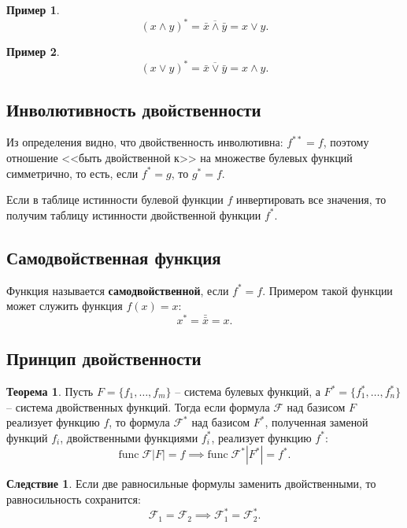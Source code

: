 \documentclass[a5paper, 11pt]{extarticle}
\theoremstyle{definition}
\newtheorem*{theorem*}{Теорема}
\newtheorem{example}{Пример}[subsection]
\theoremstyle{definition}
\theoremstyle{definition}
\newtheorem*{consequence*}{Следствие}
\numberwithin{figure}{section}
\numberwithin{table}{section}
\begin{document}
\begin{example}
    \[
        (x \land y)^* = \overline{\bar{x} \land \bar{y}} = x \lor y.
    \]
\end{example}

\begin{example}
    \[
        (x \lor y)^* = \overline{\bar{x} \lor \bar{y}} = x \land y.
    \]
\end{example}

\subsection{Инволютивность двойственности}

Из определения видно, что двойственность инволютивна: \(f^{**} = f\), поэтому отношение <<быть двойственной к>> на множестве булевых функций симметрично, то есть, если \(f^* = g\), то \(g^* = f\).

Если в таблице истинности булевой функции \(f\) инвертировать все значения, то получим таблицу истинности двойственной функции \(f^*\).

\subsection{Самодвойственная функция}

Функция называется \textbf{самодвойственной}, если \(f^* = f\). Примером такой функции может служить функция \(f(x) = x\):
\[
    x^* = \bar{\bar{x}} = x.
\]

\subsection{Принцип двойственности}

\begin{theorem*}
    Пусть \(F = \{f_1, \ldots, f_m\}\) -- система булевых функций, а \(F^* = \{f_1^*, \ldots, f_n^*\}\) -- система двойственных функций. Тогда если формула \(\mathcal{F}\) над базисом \(F\) реализует функцию \(f\), то формула \(\mathcal{F}^*\) над базисом \(F^*\), полученная заменой функций \(f_i\), двойственными функциями \(f_i^*\), реализует функцию \(f^*\):
    \[
        \text{func} \; \mathcal{F} |F| = f
        \implies
        \text{func} \; \mathcal{F}^* |F^*| = f^*.
    \]

    \begin{consequence*}
        Если две равносильные формулы заменить двойственными, то равносильность сохранится:
        \[
            \mathcal{F}_1 = \mathcal{F}_2
            \implies
            \mathcal{F}_1^* = \mathcal{F}_2^*.
        \]
    \end{consequence*}
\end{theorem*}
\end{document}
